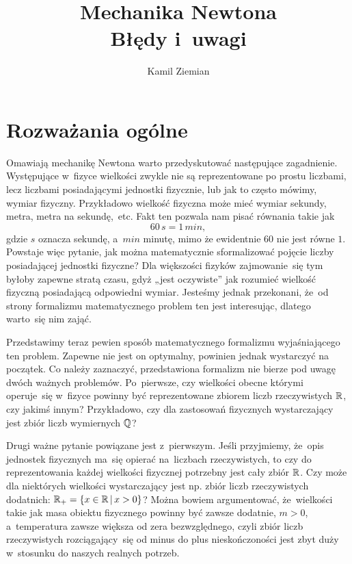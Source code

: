 \documentclass[a4paper,11pt]{article}
\title{Mechanika Newtona \\
  {\Large Błędy i~uwagi}}
\author{Kamil Ziemian}
\numberwithin{equation}{section}
\begin{document}





\maketitle





\section{Rozważania ogólne}



Omawiają mechanikę Newtona warto przedyskutować następujące zagadnienie.
Występujące w~fizyce wielkości zwykle nie są reprezentowane po prostu
liczbami, lecz liczbami posiadającymi jednostki fizycznie, lub jak to
często mówimy, wymiar fizyczny. Przykładowo wielkość fizyczna może mieć
wymiar sekundy, metra, metra na sekundę,~etc. Fakt ten pozwala
nam pisać równania takie jak
\begin{equation}
  \label{eq:Mechanika-Rozwazania-ogolne-01}
  60 \, \si{s} = 1 \, \si{min},
\end{equation}
gdzie $\si{s}$ oznacza sekundę, a~$\si{min}$ minutę, mimo że ewidentnie
$60$ nie jest równe $1$. Powstaje więc pytanie, jak można matematycznie
sformalizować pojęcie liczby posiadającej jednostki fizyczne? Dla większości
fizyków zajmowanie~się tym byłoby zapewne stratą czasu, gdyż „jest
oczywiste” jak rozumieć wielkość fizyczną posiadającą odpowiedni wymiar.
Jesteśmy jednak przekonani, że~od strony formalizmu matematycznego problem
ten jest interesując, dlatego warto~się nim zająć.

Przedstawimy teraz pewien sposób matematycznego formalizmu wyjaśniającego
ten problem. Zapewne nie jest on optymalny, powinien jednak wystarczyć na
początek. Co należy zaznaczyć, przedstawiona formalizm nie bierze pod uwagę
dwóch ważnych problemów. Po~pierwsze, czy wielkości obecne którymi
operuje~się w~fizyce powinny być reprezentowane zbiorem liczb rzeczywistych
$\mathbb{R}$, czy jakimś innym? Przykładowo, czy dla zastosowań fizycznych
wystarczający jest zbiór liczb wymiernych $\mathbb{Q}$?

Drugi ważne pytanie powiązane jest z~pierwszym. Jeśli przyjmiemy,
że~opis jednostek fizycznych ma~się opierać na~liczbach rzeczywistych,
to czy do reprezentowania każdej wielkości fizycznej potrzebny jest cały
zbiór $\mathbb{R}$. Czy może dla niektórych wielkości wystarczający jest np.
zbiór liczb rzeczywistych dodatnich:
$\mathbb{R}_{ + } = \{ x \in \mathbb{R} \, | \, x > 0 \}$? Można bowiem argumentować,
że~wielkości takie jak masa obiektu fizycznego powinny być zawsze dodatnie,
$m > 0$, a~temperatura zawsze większa od zera bezwzględnego, czyli zbiór
liczb rzeczywistych rozciągający~się od minus do plus nieskończoności jest
zbyt duży w~stosunku do naszych realnych potrzeb.
\end{document}
